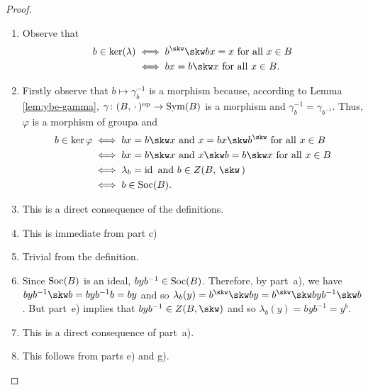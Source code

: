 \begin{proof}${}$
    \begin{enumerate}[\rm a)]
        \item Observe that
        \begin{align*}
            b\in\ker(\lambda)
                &\iff b^\skw\skw bx=x\text{ for all }x\in B
                    \nonumber\\
                &\iff bx = b\skw x\text{ for all }x\in B. 
        \end{align*}

        \item %
        
        Firstly observe that $b\mapsto\gamma_b^{-1}$ is a morphism because, according to Lemma \ref{lem:ybe-gamma}, $\gamma\colon(B,\,\cdot\,)^{\operatorname{op}}\to{\rm Sym}(B)$ is a morphism and $\gamma_b^{-1}=\gamma_{b^{-1}}$. Thus, $\varphi$ is a morphism of groupa and
        \begin{align*}
            b \in\ker\varphi
                &\iff bx=b\skw x
                    \text{ and }
                    x=bx\skw b^\skw
                    \text{ for all }x\in B\\
                &\iff bx = b\skw x
                    \text{ and }
                    x\skw b = b\skw x
                    \text{ for all }x\in B\\
                &\iff \lambda_b=\id
                    \text{ and }
                    b\in Z(B,\,\skw\,)\\
                &\iff b\in\Soc(B).
        \end{align*}

        \item This is a direct consequence of the definitions.

        \item This is immediate from part c)

        \item Trivial from the definition.

        \item Since ${\rm Soc}(B)$ is an ideal, $byb^{-1}\in{\rm Soc}(B)$. Therefore, by part~a), we have $byb^{-1}\skw b=byb^{-1}b=by$ and so $\lambda_b(y)=b^\skw\skw by=b^\skw\skw byb^{-1}\skw b$. But part~e) implies that $byb^{-1}\in Z(B,\skw)$ and so $\lambda_b(y) = byb^{-1}=y^b$.

        \item This is a direct consequence of part~a).

        \item This follows from parts e) and g).
    \end{enumerate}
\end{proof}


